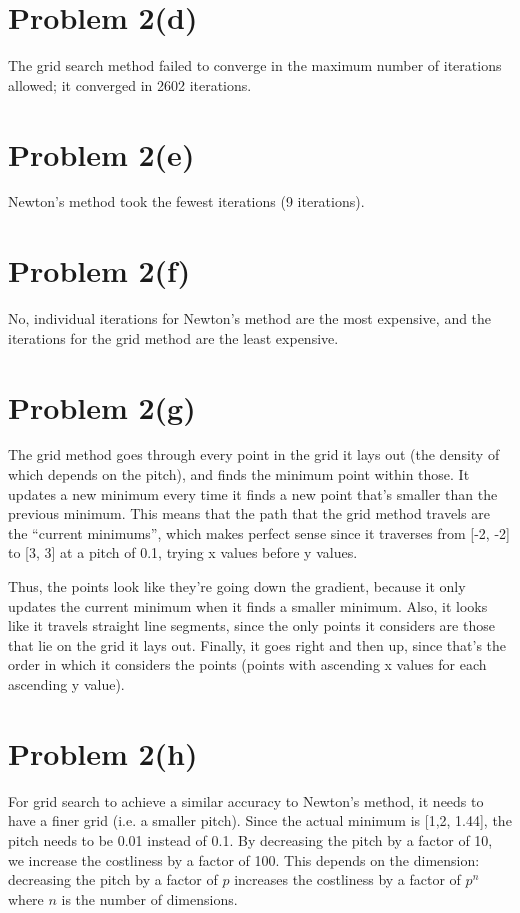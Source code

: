 \documentclass{article}
\begin{document}
\section*{Problem 2(d)}

The grid search method failed to converge in the maximum number of iterations allowed; it converged in 2602 iterations.

\section*{Problem 2(e)}

Newton's method took the fewest iterations (9 iterations).

\section*{Problem 2(f)}

No, individual iterations for Newton's method are the most expensive, and the iterations for the grid method are the least expensive.

\section*{Problem 2(g)}

The grid method goes through every point in the grid it lays out (the density of which depends on the pitch), and finds the minimum point within those. It updates a new minimum every time it finds a new point that's smaller than the previous minimum. This means that the path that the grid method travels are the ``current minimums'', which makes perfect sense since it traverses from [-2, -2] to [3, 3] at a pitch of 0.1, trying x values before y values. 

Thus, the points look like they're going down the gradient, because it only updates the current minimum when it finds a smaller minimum. Also, it looks like it travels straight line segments, since the only points it considers are those that lie on the grid it lays out. Finally, it goes right and then up, since that's the order in which it considers the points (points with ascending x values for each ascending y value).

\section*{Problem 2(h)}

For grid search to achieve a similar accuracy to Newton's method, it needs to have a finer grid (i.e. a smaller pitch). Since the actual minimum is [1,2, 1.44], the pitch needs to be 0.01 instead of 0.1. By decreasing the pitch by a factor of 10, we increase the costliness by a factor of 100. This depends on the dimension: decreasing the pitch by a factor of $p$ increases the costliness by a factor of $p^n$ where $n$ is the number of dimensions.
\end{document}
